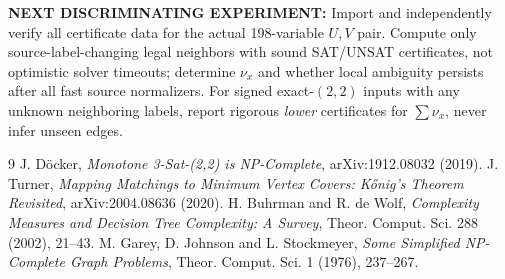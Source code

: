 \documentclass[11pt]{article}
\begin{document}
\textbf{NEXT DISCRIMINATING EXPERIMENT:} Import and independently verify all certificate data for the actual 198-variable $U,V$ pair. Compute only source-label-changing legal neighbors with sound SAT/UNSAT certificates, not optimistic solver timeouts; determine $\nu_x$ and whether local ambiguity persists after all fast source normalizers. For signed exact-$(2,2)$ inputs with any unknown neighboring labels, report rigorous \emph{lower} certificates for $\sum\nu_x$, never infer unseen edges.
\begin{thebibliography}{9}
 J. D\"ocker, \emph{Monotone 3-Sat-(2,2) is NP-Complete}, arXiv:1912.08032 (2019).
 J. Turner, \emph{Mapping Matchings to Minimum Vertex Covers: K\H{o}nig's Theorem Revisited}, arXiv:2004.08636 (2020).
 H. Buhrman and R. de Wolf, \emph{Complexity Measures and Decision Tree Complexity: A Survey}, Theor. Comput. Sci. 288 (2002), 21--43.
 M. Garey, D. Johnson and L. Stockmeyer, \emph{Some Simplified NP-Complete Graph Problems}, Theor. Comput. Sci. 1 (1976), 237--267.
\end{thebibliography}
\end{document}
